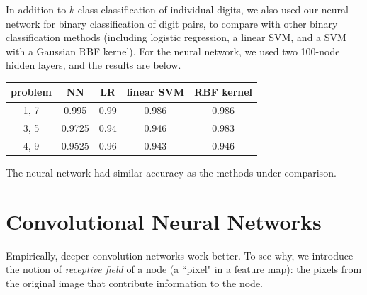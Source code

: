 \documentclass{article}
\begin{document}
\begin{multicols}{2}







In addition to $k$-class classification of individual digits,
we also used our neural network for binary classification of digit pairs,
to compare with other binary classification methods
(including logistic regression, a linear SVM,
and a SVM with a Gaussian RBF kernel).
For the neural network, we used two 100-node hidden layers,
and the results are below.

\begin{center}
\begin{tabular}{c|c|c|c|c}
problem		& NN	& LR		& linear SVM	& RBF kernel \\\hline
        1, 7		& 0.995 	& 0.99 	& 0.986		& 0.986 \\
        3, 5		& 0.9725 	& 0.94 	& 0.946		& 0.983 \\
        4, 9		& 0.9525 	& 0.96 	& 0.943 		& 0.946 \\
\end{tabular}
\end{center}
The neural network had similar accuracy as the methods under comparison.

\section{Convolutional Neural Networks}


Empirically, deeper convolution networks work better.
To see why, we introduce the notion of \emph{receptive field}
of a node (a ``pixel" in a feature map):
the pixels from the original image that contribute information
to the node.


\end{multicols}
\end{document}
